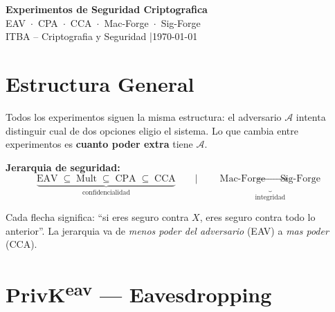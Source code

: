 \documentclass[a4paper,11pt]{article}
\begin{document}
\begin{tcolorbox}[
  enhanced,
  colback=darkBg,
  colframe=darkBg,
  sharp corners,
  halign=center,
  valign=center,
  height=5cm,
]
  {\color{white}\Huge\bfseries Experimentos de Seguridad Criptografica}\\[8pt]
  {\color{itbaBlue}\large EAV \,$\cdot$\, CPA \,$\cdot$\, CCA \,$\cdot$\, Mac-Forge \,$\cdot$\, Sig-Forge}\\[12pt]
  {\color{midGray}\normalsize ITBA -- Criptografia y Seguridad \quad|\quad \today}
\end{tcolorbox}

\vspace{0.5cm}

\tableofcontents

\vspace{1cm}

\section{Estructura General}

Todos los experimentos siguen la misma estructura: el adversario $\mathcal{A}$ intenta distinguir cual de dos opciones eligio el sistema. Lo que cambia entre experimentos es \textbf{cuanto poder extra} tiene $\mathcal{A}$.

\begin{tcolorbox}[
  enhanced,
  colback=lightGray,
  colframe=itbaBlue,
  leftrule=3pt, rightrule=0pt, toprule=0pt, bottomrule=0pt,
  sharp corners,
]
\textbf{Jerarquia de seguridad:}
\[
  \underbrace{\text{EAV} \;\subseteq\; \text{Mult} \;\subseteq\; \text{CPA} \;\subseteq\; \text{CCA}}_{\text{confidencialidad}}
  \qquad\Big|\qquad
  \underbrace{\text{Mac-Forge} \;\longrightarrow\; \text{Sig-Forge}}_{\text{integridad}}
\]
\end{tcolorbox}

\vspace{0.3cm}
\noindent Cada flecha significa: ``si eres seguro contra $X$, eres seguro contra todo lo anterior''. La jerarquia va de \textit{menos poder del adversario} (EAV) a \textit{mas poder} (CCA).

\section{PrivK\textsuperscript{eav} --- Eavesdropping}
\end{document}
